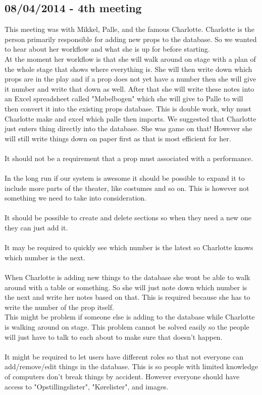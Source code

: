 \documentclass[12pt]{article}
\begin{document}
\subsection*{08/04/2014 - 4th meeting}
This meeting was with Mikkel, Palle, and the famous Charlotte. Charlotte is the person primarily responsible for adding new props to the database. So we wanted to hear about her workflow and what she is up for before starting. \\
At the moment her workflow is that she will walk around on stage with a plan of the whole stage that shows where everything is. She will then write down which props are in the play and if a prop does not yet have a number then she will give it number and write that down as well. After that she will write these notes into an Excel spreadsheet called "Møbelbogen" which she will give to Palle to will then convert it into the existing props database.
This is double work, why must Charlotte make and excel which palle then imports. We suggested that Charlotte just enters thing directly into the database. She was game on that! However she will still write things down on paper first as that is most efficient for her. \\
\\
It should not be a requirement that a prop must associated with a performance.\\\\
In the long run if our system is awesome it should be possible to expand it to include more parts of the theater, like costumes and so on. This is however not something we need to take into consideration.\\\\
It should be possible to create and delete sections so when they need a new one they can just add it.\\\\
It may be required to quickly see which number is the latest so Charlotte knows which number is the next.\\\\
When Charlotte is adding new things to the database she wont be able to walk around with a table or something. So she will just note down which number is the next and write her notes based on that. This is required because she has to write the number of the prop itself.\\
This might be problem if someone else is adding to the database while Charlotte is walking around on stage. This problem cannot be solved easily so the people will just have to talk to each about to make sure that doesn't happen.\\\\
It might be required to let users have different roles so that not everyone can add/remove/edit things in the database. This is so people with limited knowledge of computers don't break things by accident. However everyone should have access to "Opstillingslister", "Kørelister", and images.
\end{document}
